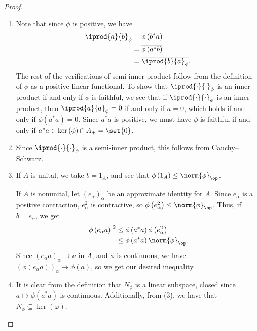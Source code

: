 \documentclass[10pt]{mypackage}
\begin{document}
\begin{proof}\hfill
  \begin{enumerate}[(1)]
    \item Note that since $\phi$ is positive, we have
      \begin{align*}
        \iprod{a}{b}_{\phi} &= \phi\left(b^{\ast}a\right)\\
                            &= \overline{\phi\left(a^{\ast}b\right)}\\
                            &= \overline{ \iprod{b}{a}_{\phi} }.
      \end{align*}
      The rest of the verifications of semi-inner product follow from the definition of $\phi$ as a positive linear functional. To show that $ \iprod{\cdot}{\cdot}_\phi$ is an inner product if and only if $\phi$ is faithful, we see that if $ \iprod{\cdot}{\cdot}_{\phi} $ is an inner product, then $ \iprod{a}{a}_{\phi} = 0 $ if and only if $a = 0$, which holds if and only if $\phi\left(a^{\ast}a\right) = 0$. Since $a^{\ast}a$ is positive, we must have $\phi$ is faithful if and only if $a^{\ast}a \in \ker\left(\phi\right)\cap A_{+} = \set{0}$.
    \item Since $ \iprod{\cdot}{\cdot}_{\phi} $ is a semi-inner product, this follows from Cauchy--Schwarz.
    \item If $A$ is unital, we take $b = 1_{A}$, and see that $\phi\left(1_A\right) \leq \norm{\phi}_{\op}$.\newline

      If $A$ is nonunital, let $\left(e_{\alpha}\right)_{\alpha}$ be an approximate identity for $A$. Since $e_{\alpha}$ is a positive contraction, $e_{\alpha}^2$ is contractive, so $\phi\left(e_{\alpha}^2\right)\leq \norm{\phi}_{\op}$. Thus, if $b = e_{\alpha}$, we get
      \begin{align*}
        \left\vert \phi\left(e_{\alpha}a\right) \right\vert^2 &\leq \phi\left(a^{\ast}a\right)\phi\left(e_{\alpha}^2\right)\\
                                                              &\leq \phi\left(a^{\ast}a\right)\norm{\phi}_{\op}.
      \end{align*}
      Since $\left(e_{\alpha}a\right)_{\alpha}\rightarrow a$ in $A$, and $\phi$ is continuous, we have $\left(\phi\left(e_{\alpha}a\right)\right)_{\alpha}\rightarrow \phi\left(a\right)$, so we get our desired inequality.
    \item It is clear from the definition that $N_{\phi}$ is a linear subspace, closed since $a\mapsto \phi\left(a^{\ast}a\right)$ is continuous. Additionally, from (3), we have that $N_{\phi}\subseteq \ker\left(\varphi\right)$.
  \end{enumerate}
\end{proof}
\end{document}

